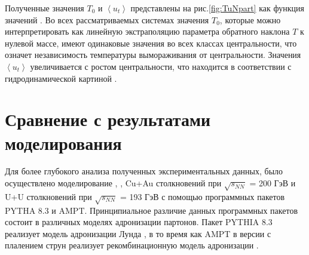 Полученные значения $T_0$ и $\left< u_t \right>$ представлены на рис.\ref{fig:TuNpart} как функция значений \Npart. Во всех рассматриваемых системах значения $T_0$, которые можно интерпретировать как линейную экстраполяцию параметра обратного наклона $T$ к нулевой массе, имеют одинаковые значения во всех классах центральности, что означет независимость температуры вымораживания от центральности. Значения $\left< u_t \right>$ увеличивается с ростом центральности, что находится в соответствии с гидродинамической картиной \cite{HydroPartonicCascade}.

\section{Сравнение с результатами моделирования} \label{sect5_spectra}

Для более глубокого анализа полученных экспериментальных данных, было осуществлено моделирование \pal, \heau, Cu+Au столкновений при $\sqrt{s_{NN}}$ = 200 ГэВ и U+U столкновений при $\sqrt{s_{NN}}$ = 193 ГэВ с помощью программных пакетов PYTHA 8.3 и AMPT.
Принципиальное различие данных программных пакетов состоит в различных моделях адронизации партонов. Пакет PYTHIA 8.3 \cite{pythia} реализует модель адронизации Лунда \cite{FragmentationLund}, в то время как AMPT \cite{AMPT} в версии с плалением струн реализует рекомбинационную модель адронизации \cite{Recombination1, Recombination2}.

